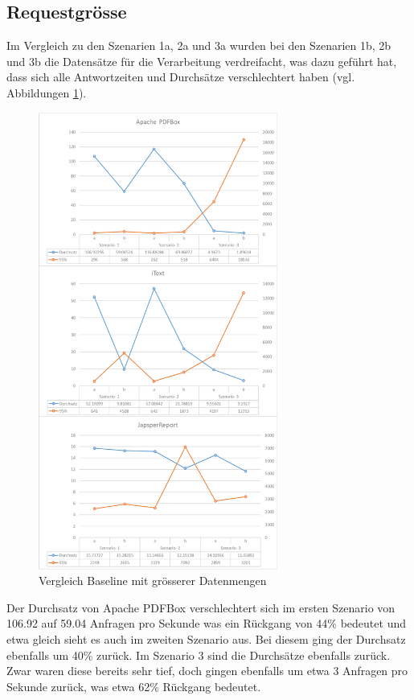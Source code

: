 \documentclass[main.tex]{subfiles}
\begin{document}
\subsection{Requestgrösse}
Im Vergleich zu den Szenarien 1a, 2a und 3a wurden bei den Szenarien 1b, 2b und 3b die Datensätze für die Verarbeitung verdreifacht, was dazu geführt hat, dass sich alle Antwortzeiten und Durchsätze verschlechtert haben (vgl. Abbildungen \ref{figure:vglABRequ}).

\begin{figure}[H]
\centering
\includegraphics[width=0.7\textwidth]{mainpart/4_analyse_img/ABAuswertung.png}
 \caption{Vergleich Baseline mit grösserer Datenmengen}
 \label{figure:vglABRequ}
\end{figure}


Der Durchsatz von Apache PDFBox verschlechtert sich im ersten Szenario von 106.92 auf 59.04 Anfragen pro Sekunde was ein Rückgang von 44\% bedeutet und etwa gleich sieht es auch im zweiten Szenario aus. Bei diesem ging der Durchsatz ebenfalls um 40\% zurück. Im Szenario 3 sind die Durchsätze ebenfalls zurück. Zwar waren diese bereits sehr tief, doch gingen ebenfalls um etwa 3 Anfragen pro Sekunde zurück, was etwa 62\% Rückgang bedeutet. 
\end{document}
